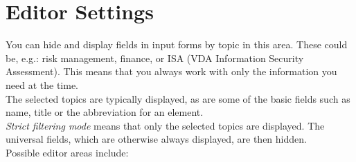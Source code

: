 \documentclass[a4paper,10pt]{book}
\begin{document}
\section{Editor Settings}
You can hide and display fields in input forms by topic in this area. These could be, e.g.: risk management, finance, or ISA (VDA Information Security
Assessment). This means that you always work with only the information you need at the time.
\newline\\
The selected topics are typically displayed, as are some of the basic fields such as name, title
or the abbreviation for an element.
\newline\\
{\em Strict filtering mode} means that only the selected topics are displayed. The universal fields, which are
otherwise always displayed, are then hidden.
\newline\\
Possible editor areas include:
\end{document}
